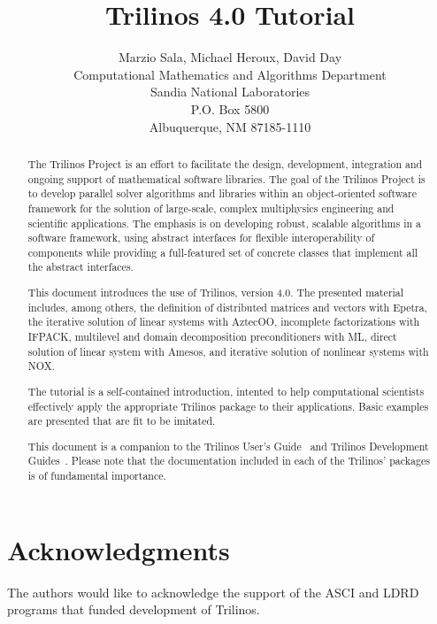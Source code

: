 \documentclass[12pt,relax]{SANDreport}
\author{Marzio Sala, Michael Heroux, David Day \\
Computational Mathematics and Algorithms Department \\
Sandia National Laboratories \\
P.O. Box 5800 \\
Albuquerque, NM 87185-1110
}
\title{Trilinos 4.0 Tutorial}
\newcommand{\Trilinos}{Trilinos}
\begin{document}
\maketitle

\begin{abstract}
  
  The Trilinos Project is an effort to facilitate the design,
  development, integration and ongoing support of mathematical software
  libraries.  The goal of the Trilinos Project is to develop parallel
  solver algorithms and libraries within an object-oriented software
  framework for the solution of large-scale, complex multiphysics
  engineering and scientific applications. The emphasis is on developing
  robust, scalable algorithms in a software framework, using abstract
  interfaces for flexible interoperability of components while providing
  a full-featured set of concrete classes that implement all the
  abstract interfaces.

  \medskip
  
  This document introduces the use of \Trilinos{}, version 4.0.  The
  presented material includes, among others, the definition of
  distributed matrices and vectors with Epetra, the iterative solution
  of linear systems with AztecOO, incomplete factorizations with IFPACK,
  multilevel and domain decomposition preconditioners with ML, direct
  solution of linear system with Amesos,
  and iterative solution of nonlinear systems with NOX.
  
  The tutorial is a self-contained introduction, intented to help
  computational scientists effectively apply the appropriate Trilinos
  package to their applications. Basic examples are presented that are
  fit to be imitated.

  \medskip
  
  This document is a companion to the Trilinos User's
  Guide~\cite{Trilinos-Users-Guide} and Trilinos Development
  Guides~\cite{Trilinos-Dev-Guide,Trilinos-Dev-Guide-II}. Please note
  that the documentation included in each of the Trilinos' packages is
  of fundamental importance.
 
\end{abstract}

\clearpage
\section*{Acknowledgments}
The authors would like to acknowledge the support of the ASCI and LDRD programs
that funded development of Trilinos.
\end{document}

